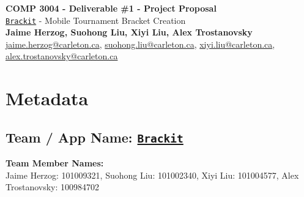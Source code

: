 \documentclass{article}
\begin{document}
\begin{center}


    \LARGE{\textbf{COMP 3004 - Deliverable \#1 - Project Proposal}} \\
    \vspace{1em}
    \Large{\href{https://github.com/alextrosta/brackit}{\texttt{Brackit}} - Mobile Tournament Bracket Creation} \\
    \vspace{1em}
    \normalsize\textbf{Jaime Herzog, Suohong Liu, Xiyi Liu, Alex Trostanovsky} \\
    \normalsize{
        \href{mailto:jaime.herzog@carleton.ca}{jaime.herzog@carleton.ca},
        \href{mailto:suohong.liu@carleton.ca}{suohong.liu@carleton.ca},
        \href{mailto:xiyi.liu@carleton.ca}{xiyi.liu@carleton.ca},
        \href{mailto:alex.trostanovsky@carleton.ca}{alex.trostanovsky@carleton.ca}
    }

\end{center}
\begin{normalsize}

\end{normalsize}

\section*{Metadata}
\subsection*{Team / App Name: \href{https://github.com/alextrosta/brackit}{\texttt{Brackit}}}
\textbf{Team Member Names:}\\ Jaime Herzog: 101009321, Suohong Liu: 101002340, Xiyi Liu: 101004577, Alex Trostanovsky: 100984702
\end{document}
